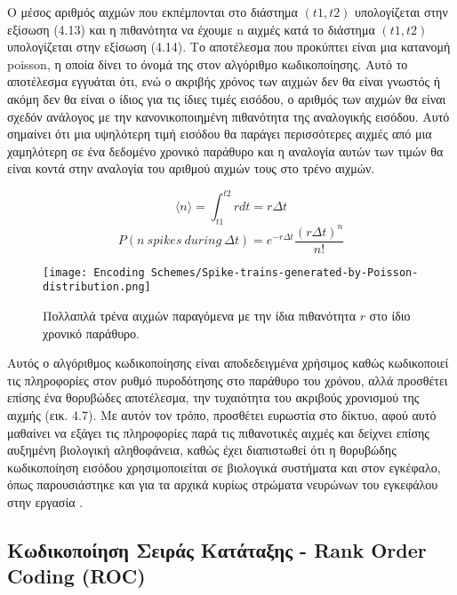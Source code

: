 \documentclass[12pt]{report}
\begin{document}
Ο μέσος αριθμός αιχμών που εκπέμπονται στο διάστημα \((t1, t2)\) υπολογίζεται στην εξίσωση (4.13) και η πιθανότητα να έχουμε n αιχμές κατά το διάστημα \((t1, t2)\) υπολογίζεται στην εξίσωση (4.14). Το αποτέλεσμα που προκύπτει είναι μια κατανομή \textlatin{poisson}, η οποία δίνει το όνομά της στον αλγόριθμο κωδικοποίησης. Αυτό το αποτέλεσμα εγγυάται ότι, ενώ ο ακριβής χρόνος των αιχμών δεν θα είναι γνωστός ή ακόμη δεν θα είναι ο ίδιος για τις ίδιες τιμές εισόδου, ο αριθμός των αιχμών θα είναι σχεδόν ανάλογος με την κανονικοποιημένη πιθανότητα της αναλογικής εισόδου. Αυτό σημαίνει ότι μια υψηλότερη τιμή εισόδου θα παράγει περισσότερες αιχμές από μια χαμηλότερη σε ένα δεδομένο χρονικό παράθυρο και η αναλογία αυτών των τιμών θα είναι κοντά στην αναλογία του αριθμού αιχμών τους στο τρένο αιχμών.

\begin{equation}
    \langle n \rangle = \int_{t1}^{t2}rdt = r\Delta t
\end{equation}
\begin{equation}
    P(n\:spikes\:during\:\Delta t) = e^{-r\Delta t}\frac{(r\Delta t)^n}{n!}
\end{equation}

\begin{figure}[htp]
    \centering
    \texttt{[image: Encoding Schemes/Spike-trains-generated-by-Poisson-distribution.png]}
    \caption{Πολλαπλά τρένα αιχμών παραγόμενα με την ίδια πιθανότητα \(r\) στο ίδιο χρονικό παράθυρο.}
    \label{fig:spikeprop-net-architecture}
\end{figure}

Αυτός ο αλγόριθμος κωδικοποίησης είναι αποδεδειγμένα χρήσιμος καθώς κωδικοποιεί τις πληροφορίες στον ρυθμό πυροδότησης στο παράθυρο του χρόνου, αλλά προσθέτει επίσης ένα θορυβώδες αποτέλεσμα, την τυχαιότητα του ακριβούς χρονισμού της αιχμής (εικ. 4.7). Με αυτόν τον τρόπο, προσθέτει ευρωστία στο δίκτυο, αφού αυτό μαθαίνει να εξάγει τις πληροφορίες παρά τις πιθανοτικές αιχμές και δείχνει επίσης αυξημένη βιολογική αληθοφάνεια, καθώς έχει διαπιστωθεί ότι η θορυβώδης κωδικοποίηση εισόδου χρησιμοποιείται σε βιολογικά συστήματα και στον εγκέφαλο, όπως παρουσιάστηκε και για τα αρχικά κυρίως στρώματα νευρώνων του εγκεφάλου στην εργασία \cite{Richmond1987}.

\subsection{Κωδικοποίηση Σειράς Κατάταξης - \textlatin{Rank Order Coding (ROC)}}
\end{document}
